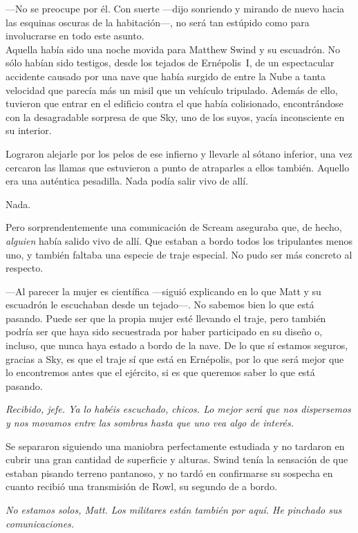 ---No se preocupe por él. Con suerte ---dijo sonriendo y mirando de nuevo hacia las esquinas oscuras de la habitación---, no será tan estúpido como para involucrarse en todo este asunto.\\

\noindent{}Aquella había sido una noche movida para Matthew Swind y su escuadrón. No sólo habían sido testigos, desde los tejados de Ernépolis~I, de un espectacular accidente causado por una nave que había surgido de entre la Nube a tanta velocidad que parecía más un misil que un vehículo tripulado. Además de ello, tuvieron que entrar en el edificio contra el que había colisionado, encontrándose con la desagradable sorpresa de que Sky, uno de los suyos, yacía inconsciente en su interior.

Lograron alejarle por los pelos de ese infierno y llevarle al sótano inferior, una vez cercaron las llamas que estuvieron a punto de atraparles a ellos también. Aquello era una auténtica pesadilla. Nada podía salir vivo de allí.

Nada.

Pero sorprendentemente una comunicación de Scream aseguraba que, de hecho, \emph{alguien} había salido vivo de allí. Que estaban a bordo todos los tripulantes menos uno, y también faltaba una especie de traje especial. No pudo ser más concreto al respecto.

---Al parecer la mujer es científica ---siguió explicando en lo que Matt y su escuadrón le escuchaban desde un tejado---. No sabemos bien lo que está pasando. Puede ser que la propia mujer esté llevando el traje, pero también podría ser que haya sido secuestrada por haber participado en su diseño o, incluso, que nunca haya estado a bordo de la nave. De lo que sí estamos seguros, gracias a Sky, es que el traje sí que está en Ernépolis, por lo que será mejor que lo encontremos antes que el ejército, si es que queremos saber lo que está pasando.

\emph{Recibido, jefe. Ya lo habéis escuchado, chicos. Lo mejor será que nos dispersemos y nos movamos entre las sombras hasta que uno vea algo de interés.}

Se separaron siguiendo una maniobra perfectamente estudiada y no tardaron en cubrir una gran cantidad de superficie y alturas. Swind tenía la sensación de que estaban pisando terreno pantanoso, y no tardó en confirmarse su sospecha en cuanto recibió una transmisión de Rowl, su segundo de a bordo.

\emph{No estamos solos, Matt. Los militares están también por aquí. He pinchado sus comunicaciones.}

